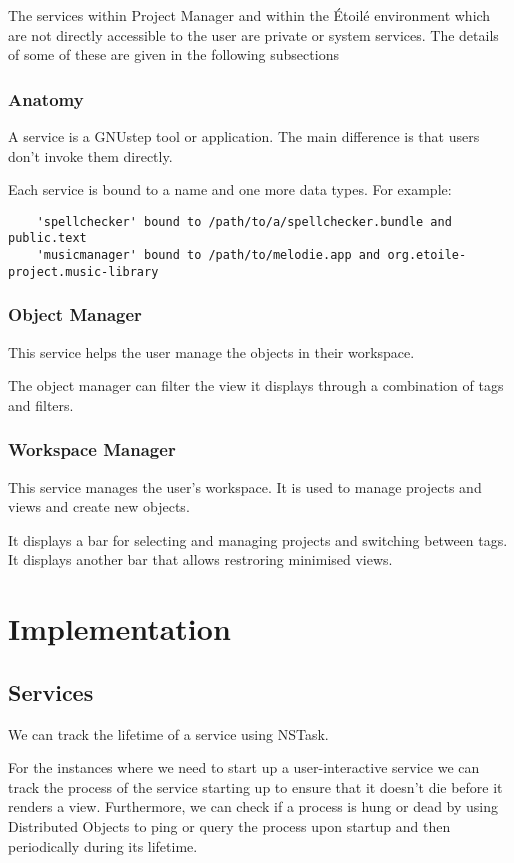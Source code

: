 \documentclass[11pt]{report}
\newcommand{\etoile}{\'Etoil\'e\xspace}
\newcommand{\proman}{Project Manager\xspace}
\newcommand{\gnustep}{GNUstep\xspace}
\begin{document}
The services within \proman and within the \etoile environment which are not directly accessible to the user are private or system services. The details of some of these are given in the following subsections

\subsection{Anatomy}

A service is a \gnustep tool or application. The main difference is that users don't invoke them directly. 

Each service is bound to a name and one more data types. For example:
\begin{verbatim}
	'spellchecker' bound to /path/to/a/spellchecker.bundle and public.text 
	'musicmanager' bound to /path/to/melodie.app and org.etoile-project.music-library
\end{verbatim}
\subsection{Object Manager}

This service helps the user manage the objects in their workspace.

The object manager can filter the view it displays through a combination of tags and filters. 

\subsection{Workspace Manager}

This service manages the user's workspace. It is used to manage projects and views and create new objects.

It displays a bar for selecting and managing projects and switching between tags. It displays another bar that allows restroring minimised views.

\chapter{Implementation}
\section{Services}
We can track the lifetime of a service using NSTask.

For the instances where we need to start up a user-interactive service we can track the process of the service starting up to ensure that it doesn't die before it renders a view. Furthermore, we can check if a process is hung or dead by using Distributed Objects to ping or query the process upon startup and then periodically during its lifetime.
\end{document}
